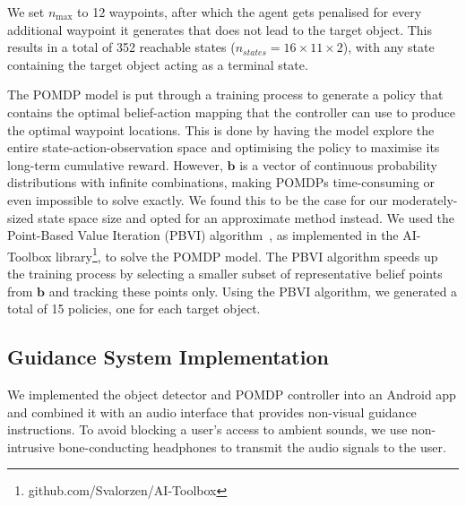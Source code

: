 \documentclass[runningheads]{llncs}
\begin{document}
\noindent We set $n_{\max}$ to 12 waypoints, after which the agent gets penalised for every additional waypoint it generates that does not lead to the target object. 
This results in a total of 352 reachable states ($n_{states} = 16\times11\times2$), with any state containing the target object acting as a terminal state.

The POMDP model is put through a training process to generate a policy that contains the optimal belief-action mapping that the controller can use to produce the optimal waypoint locations.
This is done by having the model explore the entire state-action-observation space and optimising the policy to maximise its long-term cumulative reward.
However, $\mathbf{b}$ is a vector of continuous probability distributions with infinite combinations, making POMDPs time-consuming or even impossible to solve exactly.
We found this to be the case for our moderately-sized state space size and opted for an approximate method instead.
We used the Point-Based Value Iteration (PBVI) algorithm~\cite{pineau2003point}, as implemented in the AI-Toolbox library\footnote{github.com/Svalorzen/AI-Toolbox}, to solve the POMDP model.
The PBVI algorithm speeds up the training process by selecting a smaller subset of representative belief points from $\mathbf{b}$ and tracking these points only. 
Using the PBVI algorithm, we generated a total of 15 policies, one for each target object. 

\subsection{Guidance System Implementation}



We implemented the object detector and POMDP controller into an Android app and combined it with an audio interface that provides non-visual guidance instructions.
To avoid blocking a user's access to ambient sounds, we use non-intrusive bone-conducting headphones to transmit the audio signals to the user. 
\end{document}
